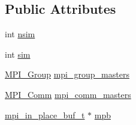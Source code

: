 \subsection*{\-Public \-Attributes}
\begin{DoxyCompactItemize}
\item 
int \hyperlink{structgmx__multisim__t_ad758914610261b48dd4c051cbf63731e}{nsim}
\item 
int \hyperlink{structgmx__multisim__t_a98e4c32615ea5face5806ed46de97ca6}{sim}
\item 
\hyperlink{include_2thread__mpi_2mpi__bindings_8h_a8210cea4617d63f74cf5ca80c3cc613f}{\-M\-P\-I\-\_\-\-Group} \hyperlink{structgmx__multisim__t_a331ca0f3da3834fe0f857c8230fdd621}{mpi\-\_\-group\-\_\-masters}
\item 
\hyperlink{include_2thread__mpi_2mpi__bindings_8h_a3880364558bd42f832e48ed33e6fafbb}{\-M\-P\-I\-\_\-\-Comm} \hyperlink{structgmx__multisim__t_aa648250d821aa720be7e6f081570e24d}{mpi\-\_\-comm\-\_\-masters}
\item 
\hyperlink{structmpi__in__place__buf__t}{mpi\-\_\-in\-\_\-place\-\_\-buf\-\_\-t} $\ast$ \hyperlink{structgmx__multisim__t_a87647eba08be913be03ba0fecd3c2924}{mpb}
\end{DoxyCompactItemize}


